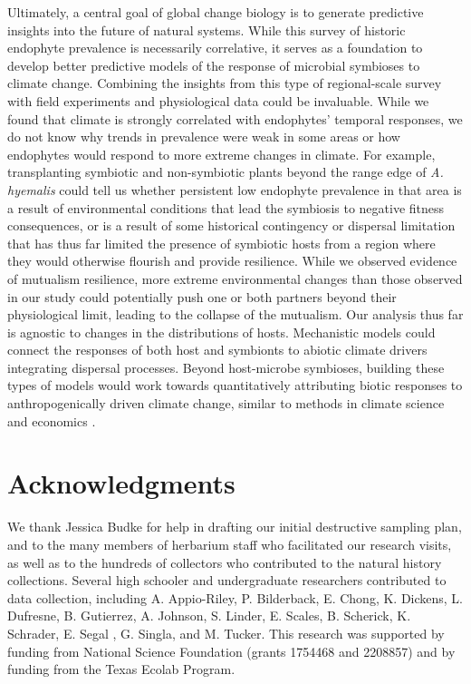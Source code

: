 \documentclass[11pt]{article}
\begin{document}
Ultimately, a central goal of global change biology is to generate predictive insights into the future of natural systems. 
While this survey of historic endophyte prevalence is necessarily correlative, it serves as a foundation to develop better predictive models of the response of microbial symbioses to climate change. 
Combining the insights from this type of regional-scale survey with field experiments and physiological data could be invaluable. 
While we found that climate is strongly correlated with endophytes' temporal responses, we do not know why trends in prevalence were weak in some areas or how endophytes would respond to more extreme changes in climate.
For example, transplanting symbiotic and non-symbiotic plants beyond the range edge of \emph{A. hyemalis} could tell us whether persistent low endophyte prevalence in that area is a result of environmental conditions that lead the symbiosis to negative fitness consequences, or is a result of some historical contingency or dispersal limitation that has thus far limited the presence of symbiotic hosts from a region where they would otherwise flourish and provide resilience.
While we observed evidence of mutualism resilience, more extreme environmental changes than those observed in our study could potentially push one or both partners beyond their physiological limit, leading to the collapse of the mutualism. 
Our analysis thus far is agnostic to changes in the distributions of hosts. 
Mechanistic models could connect the responses of both host and symbionts to abiotic climate drivers integrating dispersal processes. 
Beyond host-microbe symbioses, building these types of models would work towards quantitatively attributing biotic responses to anthropogenically driven climate change, similar to methods in climate science and economics \citep{stott2010detection, carleton2016social}.



	
	\section*{Acknowledgments}
	We thank Jessica Budke for help in drafting our initial destructive sampling plan, and to the many members of herbarium staff who facilitated our research visits, as well as to the hundreds of collectors who contributed to the natural history collections. 
	Several high schooler and undergraduate researchers contributed to data collection, including A. Appio-Riley, P. Bilderback, E. Chong, K. Dickens, L. Dufresne, B. Gutierrez, A. Johnson, S. Linder, E. Scales, B. Scherick, K. Schrader, E. Segal , G. Singla, and M. Tucker.
	This research was supported by funding from National Science Foundation (grants 1754468 and 2208857) and by funding from the Texas Ecolab Program.
\end{document}
